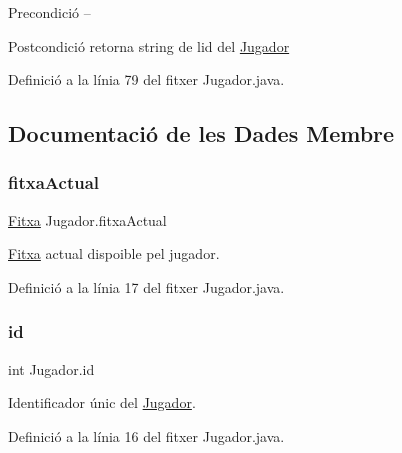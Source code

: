\begin{DoxyPrecond}{Precondició}
-- 
\end{DoxyPrecond}
\begin{DoxyPostcond}{Postcondició}
retorna string de l\textquotesingle{}id del \mbox{\hyperlink{class_jugador}{Jugador}} 
\end{DoxyPostcond}


Definició a la línia 79 del fitxer Jugador.\+java.



\subsection{Documentació de les Dades Membre}
\mbox{\label{class_jugador_a221c891bd7f14049abe513c2705ac5bc}} 
\subsubsection{\texorpdfstring{fitxa\+Actual}{fitxaActual}}
{\footnotesize\ttfamily \mbox{\hyperlink{class_fitxa}{Fitxa}} Jugador.\+fitxa\+Actual\hspace{0.3cm}{\ttfamily [private]}}



\mbox{\hyperlink{class_fitxa}{Fitxa}} actual dispoible pel jugador. 



Definició a la línia 17 del fitxer Jugador.\+java.

\mbox{\label{class_jugador_aa400235b2aead9a7794fcca3c74f3a1b}} 
\subsubsection{\texorpdfstring{id}{id}}
{\footnotesize\ttfamily int Jugador.\+id\hspace{0.3cm}{\ttfamily [private]}}



Identificador únic del \mbox{\hyperlink{class_jugador}{Jugador}}. 



Definició a la línia 16 del fitxer Jugador.\+java.

\mbox{\label{class_jugador_aeae26acfb52e206e3fad8e30aca285b8}} 
